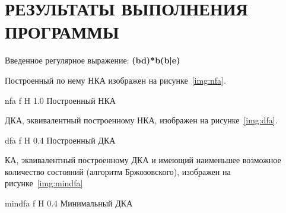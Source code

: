 \chapter*{РЕЗУЛЬТАТЫ ВЫПОЛНЕНИЯ ПРОГРАММЫ}

Введенное регулярное выражение: \textbf{(bd)*b(b|e)}

Построенный по нему НКА изображен на рисунке~\ref{img:nfa}.

{nfa}
{f} 
{H}
{1.0\textwidth}
{Построенный НКА} 

ДКА, эквивалентный построенному НКА, изображен на рисунке~\ref{img:dfa}.

{dfa}
{f} 
{H}
{0.4\textwidth}
{Построенный ДКА} 

КА, эквивалентный построенному ДКА и имеющий наименьшее
возможное количество состояний (алгоритм Бржозовского), изображен на рисунке~\ref{img:mindfa}

{mindfa}
{f} 
{H}
{0.4\textwidth}
{Минимальный ДКА} 

